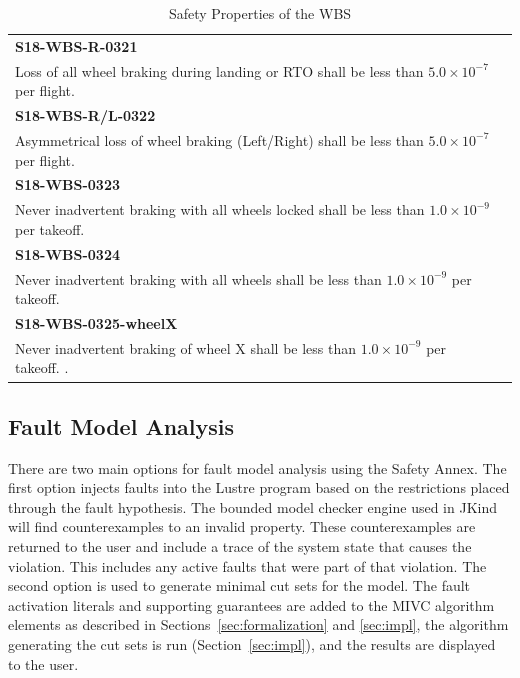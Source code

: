 \begin{table}[htbp]
\begin{center}
\begin{tabular}{@{}ll}
\toprule
\textbf{S18-WBS-R-0321} \\Loss of all wheel braking during landing or RTO shall be less than $5.0 \times 10^{-7}$ per flight.                                    \\ \midrule 
\textbf{S18-WBS-R/L-0322}  \\ Asymmetrical loss of wheel braking (Left/Right) shall be less than $5.0 \times 10^{-7}$ per flight. \\ \midrule
\textbf{S18-WBS-0323} \\ Never inadvertent braking with all wheels locked shall be less than $1.0 \times 10^{-9}$ per takeoff.                                                                                                                                                                                                               \\ \midrule
\textbf{S18-WBS-0324}  \\ Never inadvertent braking with all wheels shall be less than $1.0 \times 10^{-9}$ per takeoff.                                                                                                            \\ \midrule
\textbf{S18-WBS-0325-wheelX} \\ Never inadvertent braking of wheel X shall be less than $1.0 \times 10^{-9}$ per takeoff.                                                                                                           .                                                                                                                 \\ \bottomrule
\end{tabular}
\caption{Safety Properties of the WBS}
\label{tab:safetyProperties}
\end{center} 
\end{table} 


\subsection{Fault Model Analysis}
There are two main options for fault model analysis using the Safety Annex. The first option injects faults into the Lustre program based on the restrictions placed through the fault hypothesis. The bounded model checker engine used in JKind will find counterexamples to an invalid property. These counterexamples are returned to the user and include a trace of the system state that causes the violation. This includes any active faults that were part of that violation. The second option is used to generate minimal cut sets for the model. The fault activation literals and supporting guarantees are added to the MIVC algorithm elements as described in Sections~\ref{sec:formalization} and \ref{sec:impl}, the algorithm generating the cut sets is run (Section~\ref{sec:impl}), and the results are displayed to the user. 

